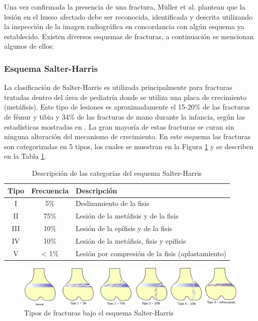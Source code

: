 Una vez confirmada la presencia de una fractura, M\"{u}ller et al. \cite{MULL90} plantean que la lesi\'on en el hueso afectado debe ser reconocida, identificada y descrita utilizando la inspecci\'on de la imagen radiogr\'afica en concordancia con alg\'un esquema ya establecido. Existen diversos esquemas de fracturas, a continuaci\'on se mencionan algunos de ellos:

\subsubsection{Esquema Salter-Harris}

La clasificaci\'on de Salter-Harris es utilizada principalmente para fracturas tratadas dentro del \'area de pediatr\'ia donde se utiliza una placa de crecimiento (met\'afisis). Este tipo de lesiones es aproximadamente el 15-20\% de las fracturas de f\'emur y tibia y 34\% de las fracturas de mano durante la infancia, seg\'un las estad\'isticas mostradas en \cite{UZE06}. La gran mayor\'ia de estas fracturas se curan sin ninguna alteraci\'on del mecanismo de crecimiento. En este esquema las fracturas son categorizadas en 5 tipos, los cuales se muestran en la Figura \ref{fig:SalterHarris} y se describen en la Tabla \ref{tab:fract}.

\begin{table}[htp]
\center
\begin{tabular}{|c|c|l|}
\hline
Tipo & Frecuencia & Descripci\'on \\ \hline
I & 5\% & Deslizamiento de la fisis \\ 
II & 75\% & Lesi\'on de la met\'afisis y de la fisis \\ 
III & 10\% & Lesi\'on de la ep\'ifisis y de la fisis \\ 
IV & 10\% & Lesi\'on de la met\'afisis, fisis y ep\'ifisis \\ 
V & < 1\% & Lesi\'on por compresi\'on de la fisis (aplastamiento) \\ 
\hline
\end{tabular}
\caption{Descripci\'on  de las categor\'ias del esquema Salter-Harris}
\label{tab:fract}
\end{table}

\begin{figure}[htb]
	\centering
		\includegraphics[width=1.0\columnwidth]{images/SalterHarris2.png}
		\caption{Tipos de fracturas bajo el esquema Salter-Harris}
	\label{fig:SalterHarris}
\end{figure}

